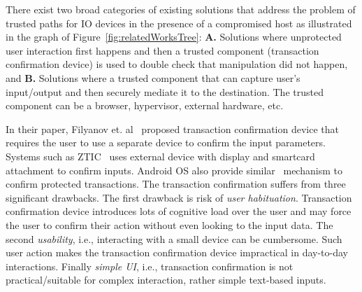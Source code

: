 There exist two broad categories of existing solutions that address the problem of trusted paths for IO devices in the presence of a compromised host as illustrated in the graph of Figure~\ref{fig:relatedWorksTree}: \textbf{A.} Solutions where unprotected user interaction first happens and then a trusted component (transaction confirmation device) is used to double check that manipulation did not happen, and \textbf{B.} Solutions where a trusted component that can capture user's input/output and then securely mediate it to the destination. The trusted component can be a browser, hypervisor, external hardware, etc. %

 In their paper, Filyanov et. al~\cite{filyanov2011uni} proposed transaction confirmation device that requires the user to use a separate device to confirm the input parameters. Systems such as ZTIC~\cite{weigold2011secure} uses external device with display and smartcard attachment to confirm inputs. Android OS also provide similar~\cite{android_confirm} mechanism to confirm protected transactions. The transaction confirmation suffers from three significant drawbacks. The first drawback is risk of \emph{user habituation}. Transaction confirmation device introduces lots of cognitive load over the user and may force the user to confirm their action without even looking to the input data. The second \emph{usability}, i.e., interacting with a small device can be cumbersome. Such user action makes the transaction confirmation device impractical in day-to-day interactions. Finally \emph{simple UI}, i.e., transaction confirmation is not practical/suitable for complex interaction, rather simple text-based inputs. 


